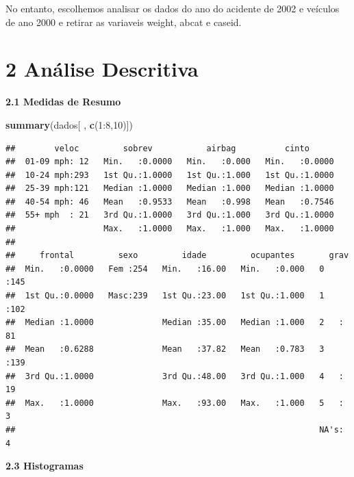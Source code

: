 \documentclass[]{article}
\newenvironment{Shaded}{\begin{snugshade}}{\end{snugshade}}
\newcommand{\KeywordTok}[1]{\textcolor[rgb]{0.13,0.29,0.53}{\textbf{{#1}}}}
\newcommand{\DecValTok}[1]{\textcolor[rgb]{0.00,0.00,0.81}{{#1}}}
\newcommand{\NormalTok}[1]{{#1}}
\begin{document}
No entanto, escolhemos analisar os dados do ano do acidente de 2002 e
veículos de ano 2000 e retirar as variaveis weight, abcat e caseid.

\section{2 Análise Descritiva}\label{analise-descritiva}

\textbf{2.1 Medidas de Resumo}

\begin{Shaded}
\begin{Highlighting}[]
\KeywordTok{summary}\NormalTok{(dados[ , }\KeywordTok{c}\NormalTok{(}\DecValTok{1}\NormalTok{:}\DecValTok{8}\NormalTok{,}\DecValTok{10}\NormalTok{)])}
\end{Highlighting}
\end{Shaded}

\begin{verbatim}
##        veloc         sobrev           airbag          cinto       
##  01-09 mph: 12   Min.   :0.0000   Min.   :0.000   Min.   :0.0000  
##  10-24 mph:293   1st Qu.:1.0000   1st Qu.:1.000   1st Qu.:1.0000  
##  25-39 mph:121   Median :1.0000   Median :1.000   Median :1.0000  
##  40-54 mph: 46   Mean   :0.9533   Mean   :0.998   Mean   :0.7546  
##  55+ mph  : 21   3rd Qu.:1.0000   3rd Qu.:1.000   3rd Qu.:1.0000  
##                  Max.   :1.0000   Max.   :1.000   Max.   :1.0000  
##                                                                   
##     frontal         sexo         idade         ocupantes       grav    
##  Min.   :0.0000   Fem :254   Min.   :16.00   Min.   :0.000   0   :145  
##  1st Qu.:0.0000   Masc:239   1st Qu.:23.00   1st Qu.:1.000   1   :102  
##  Median :1.0000              Median :35.00   Median :1.000   2   : 81  
##  Mean   :0.6288              Mean   :37.82   Mean   :0.783   3   :139  
##  3rd Qu.:1.0000              3rd Qu.:48.00   3rd Qu.:1.000   4   : 19  
##  Max.   :1.0000              Max.   :93.00   Max.   :1.000   5   :  3  
##                                                              NA's:  4
\end{verbatim}

\textbf{2.3 Histogramas}
\end{document}
